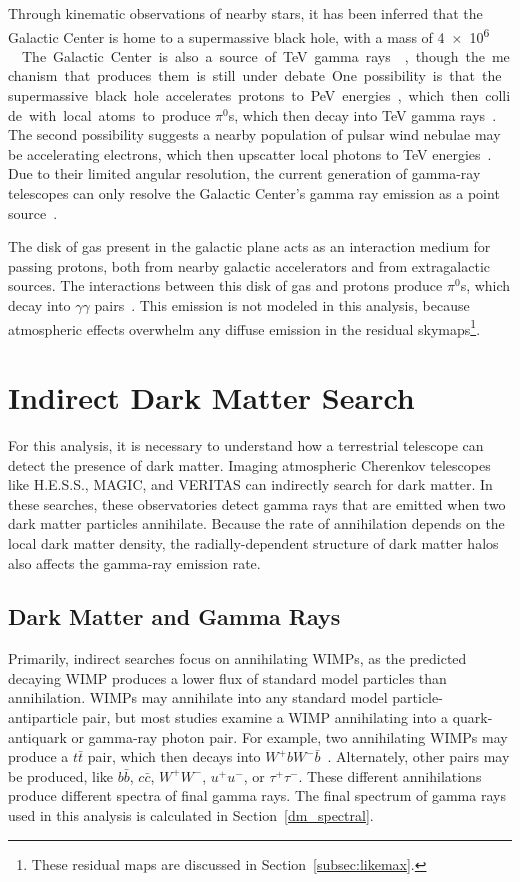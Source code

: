   Through kinematic observations of nearby stars, it has been inferred that the Galactic Center is home to a supermassive black hole, with a mass of \SI{4e6}{ \Msol{} }~\cite{sgra_massdist}.
  The Galactic Center is also a source of TeV gamma rays~\cite{gc_pointsrc_hess,gc_pointsource_hess2,gc_veritas_pointsource,gc_magic_pointsource}, though the mechanism that produces them is still under debate.
  One possibility is that the supermassive black hole accelerates protons to PeV energies, which then collide with local atoms to produce $\pi^0$s, which then decay into TeV gamma rays~\cite{gc_pevatron}.
  The second possibility suggests a nearby population of pulsar wind nebulae may be accelerating electrons, which then upscatter local photons to TeV energies~\cite{gc_pulsars}.
  Due to their limited angular resolution, the current generation of gamma-ray telescopes can only resolve the Galactic Center's gamma ray emission as a point source~\cite{VeritasGCRidge2015,gc_pointsrc_hess}.

  The disk of gas present in the galactic plane acts as an interaction medium for passing protons, both from nearby galactic accelerators and from extragalactic sources.
  The interactions between this disk of gas and protons produce $\pi^0$s, which decay into $\gamma\gamma$ pairs~\cite{hess_gc_diffuse}.
  This emission is not modeled in this analysis, because atmospheric effects overwhelm any diffuse emission in the residual skymaps\footnote{These residual maps are discussed in Section~\ref{subsec:likemax}.}.


\section{Indirect Dark Matter Search}
  For this analysis, it is necessary to understand how a terrestrial telescope can detect the presence of dark matter.
  Imaging atmospheric Cherenkov telescopes like H.E.S.S., MAGIC, and VERITAS can indirectly search for dark matter.
  In these searches, these observatories detect gamma rays that are emitted when two dark matter particles annihilate.
  Because the rate of annihilation depends on the local dark matter density, the radially-dependent structure of dark matter halos also affects the gamma-ray emission rate.

  \subsection{Dark Matter and Gamma Rays}
    Primarily, indirect searches focus on annihilating WIMPs, as the predicted decaying WIMP produces a lower flux of standard model particles than annihilation.
    WIMPs may annihilate into any standard model particle-antiparticle pair, but most studies examine a WIMP annihilating into a quark-antiquark or gamma-ray photon pair.
    For example, two annihilating WIMPs may produce a $t\bar{t}$ pair, which then decays into $W^+bW^-\bar{b}$~\cite{pdg2016}.
    Alternately, other pairs may be produced, like  $b\bar{b}$, $c\bar{c}$, $W^+W^-$, $u^+u^-$, or $\tau^+\tau^-$.
    These different annihilations produce different spectra of final gamma rays.
    The final spectrum of gamma rays used in this analysis is calculated in Section~\ref{dm_spectral}.
  
